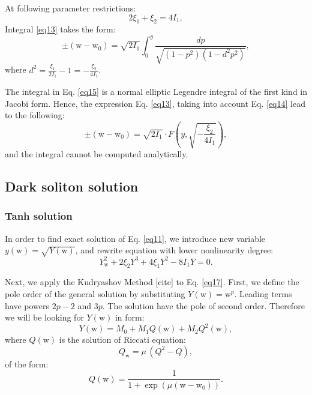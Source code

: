 \documentclass{article}
\begin{document}
At following parameter restrictions:
\begin{equation} \label{eq14}
    2 \xi_{1} + \xi_{2} = 4I_{1},
\end{equation}
Integral \ref{eq13} takes the form:
\begin{equation} \label{eq15}
    \pm \left(\mathrm{w} - \mathrm{w}_{0}\right) = \sqrt{2I_{1}}\int_{0}^{y} \frac{dp}{ \sqrt{\left(1 - p^2\right)\left(1 - d^2 p^2\right)}},
\end{equation}
where \(d^2 = \frac{\xi_{1}}{2I_{1}} -1 =-\frac{\xi_{2}}{4I_{1}}\).

The integral in Eq. \ref{eq15} is a normal elliptic Legendre integral of the first kind in Jacobi form. Hence, the expression Eq. \ref{eq13}, taking into account Eq. \ref{eq14} lead to the following:
\begin{equation} \label{eq16}
    \pm \left(\mathrm{w} - \mathrm{w}_{0}\right) = \sqrt{2I_{1}} \cdot F \left(y, \sqrt{- \frac{\xi_{2}}{4I_{1}}} \right),
\end{equation}
and the integral cannot be computed analytically.

\subsection{Dark soliton solution}
\subsubsection{Tanh solution}
    In order to find exact solution of Eq. \ref{eq11}, we introduce new variable \(y\left(\mathrm{w}\right) = \sqrt{Y\left(\mathrm{w}\right)}\), and rewrite equation with lower nonlinearity degree:
    \begin{equation} \label{eq17}
        Y^2_{\mathrm{w}} + 2\xi_{2}Y^3 + 4\xi_{1}Y^2 -8 I_{1} Y = 0.
    \end{equation}

    Next, we apply the Kudryashov Method [cite] to Eq. \ref{eq17}.
    First, we define the pole order of the general solution by substituting \(Y\left(\mathrm{w}\right) = \mathrm{w}^{p}\). Leading terms have powers \(2p-2\) and \(3p\). The solution have the pole of second order.
    Therefore we will be looking for \(Y\left(\mathrm{w}\right)\) in form:
    \begin{equation} \label{eq18}
        Y\left(\mathrm{w}\right) = M_{0} + M_{1}Q\left(\mathrm{w}\right) + M_{2}Q^2\left(\mathrm{w}\right),
    \end{equation}
    where \(Q\left(\mathrm{w}\right)\) is the solution of Riccati equation:
    \begin{equation}\label{eq19}
        Q_{\mathrm{w}} = \mu\,(Q^{2}-Q),
    \end{equation}
    of the form:
    \begin{equation}\label{eq20}
        Q(\mathrm{w}) = \frac{1}{1 + \exp\left(\mu(\mathrm{w}-\mathrm{w}_{0})\right)}.
    \end{equation}
\end{document}
